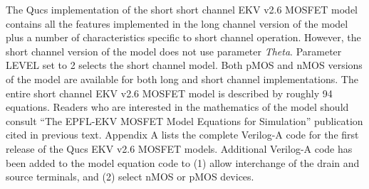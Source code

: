
The Qucs implementation of the short short channel EKV v2.6 MOSFET
model contains all the features implemented in the long channel
version of the model plus a number of characteristics specific to
short channel operation. However, the short channel version of the
model does not use parameter \textit{Theta}. Parameter LEVEL set to 2
selects the short channel model. Both pMOS and nMOS versions of the
model are available for both long and short channel implementations.
The entire short channel EKV v2.6 MOSFET model is described by roughly
94 equations. Readers who are interested in the mathematics of the
model should consult ``The EPFL-EKV MOSFET Model Equations for
Simulation'' publication cited in previous text.  Appendix A lists the
complete Verilog-A code for the first release of the Qucs EKV v2.6
MOSFET models.  Additional Verilog-A code has been added to the model
equation code to (1) allow interchange of the drain and source
terminals, and (2) select nMOS or pMOS devices.

